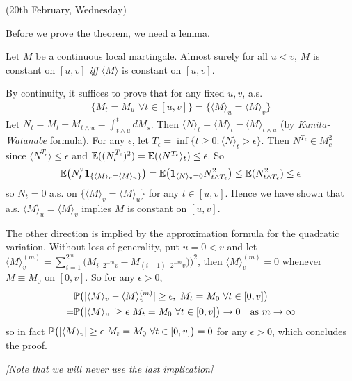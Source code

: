 \documentclass[12pt,a4paper]{article}
\newenvironment{proof}
{\begin{changemargin}{0.5cm}{0.5cm} 
	}%
	{\end{changemargin}
}
\newenvironment{p}
{\begin{proof} 
	}%
	{\end{proof}
}
\begin{document}
\newday

(20th February, Wednesday)
\s

Before we prove the theorem, we need a lemma. 
\s

\lem Let $M$ be a continuous local martingale. Almost surely for all $u<v$, $M$ is constant on $[u,v]$ \emph{iff} $\langle M \rangle$ is constant on $[u,v]$.
\begin{p}
\pf By continuity, it suffices to prove that for any fixed $u, v$, a.s.
\begin{align*}
\{ M_t = M_u \,\, \forall t\in [u,v] \} = \{ \langle M \rangle_u = \langle M \rangle_v \}
\end{align*}
Let $N_t = M_t - M_{t\wedge u} = \int_{t\wedge u}^t dM_s$. Then $\langle N \rangle_t = \langle M \rangle_t - \langle M \rangle_{t\wedge u}$ (by \emph{Kunita-Watanabe} formula). For any $\epsilon$, let $T_{\epsilon} = \inf \{t\geq 0 : \langle N \rangle_t > \epsilon \}$. Then $N^{T_{\epsilon}} \in M_c^2$ since $\langle N^{T_{\epsilon}} \rangle \leq \epsilon$ and $\mathbb{E}((N_t^{T_{\epsilon}})^2) = \mathbb{E} (\langle N^{T_{\epsilon}} \rangle_{t}) \leq \epsilon$. So 
\begin{align*}
\mathbb{E} \big( N_t^2 \bm{1}_{\{\langle M \rangle_v =\langle M \rangle_u \}} \big) = \mathbb{E} \big( \bm{1}_{\langle N \rangle_v =0} N_{t\wedge T_{\epsilon}}^2 \big) \leq \mathbb{E} (N^2_{t\wedge T_{\epsilon}}) \leq \epsilon
\end{align*}
so $N_t =0$ a.s. on $\{\langle M \rangle_v = \langle M \rangle_u \}$ for any $t\in [u,v]$. Hence we have shown that a.s. $\langle M \rangle_u = \langle M \rangle_v$ implies $M$ is constant on $[u,v]$.
\s

The other direction is implied by the approximation formula for the quadratic variation. Without loss of generality, put $u=0 < v$ and let $\langle M \rangle^{(m)}_v = \sum_{i=1}^{2^m} \big( M_{i\cdot 2^{-m}v} - M_{(i-1)\cdot 2^{-m}v}) \big)^2$, then $\langle M \rangle^{(m)}_v =0$ whenever $M \equiv M_0$ on $[0,v]$. So for any $\epsilon>0$,
\begin{align*}
&\mathbb{P} \big(  | \langle M \rangle_v - \langle M \rangle_v^{(m)} | \geq \epsilon, \,\, M_t =M_0\,\, \forall t\in[0,v] \big) \\
=& \mathbb{P} \big( |\langle M \rangle_v| \geq \epsilon \,\, M_t =M_0\,\, \forall t\in[0,v] \big) \rightarrow 0 \quad \text{as } m \rightarrow \infty
\end{align*}
so in fact $\mathbb{P} \big( |\langle M \rangle_v| \geq \epsilon \,\, M_t =M_0\,\, \forall t\in[0,v] \big) =0$ for any $\epsilon >0$, which concludes the proof.
 
\emph{[Note that we will never use the last implication]}

\eop
\end{p}
\end{document}

